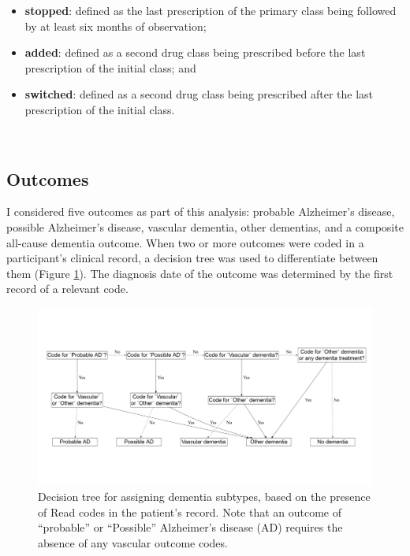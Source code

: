 \documentclass[a4paper, twoside]{templates/ociamthesis}
\providecommand{\tightlist}{%
  \setlength{\itemsep}{0pt}\setlength{\parskip}{0pt}}
\begin{document}
\begin{itemize}
\tightlist
\item
  \textbf{stopped}: defined as the last prescription of the primary class being followed by at least six months of observation;
\item
  \textbf{added}: defined as a second drug class being prescribed before the last prescription of the initial class; and
\item
  \textbf{switched}: defined as a second drug class being prescribed after the last prescription of the initial class.
\end{itemize}

~

\hypertarget{cprd-outcomes}{%
\subsection{Outcomes}\label{cprd-outcomes}}

I considered five outcomes as part of this analysis: probable Alzheimer's disease, possible Alzheimer's disease, vascular dementia, other dementias, and a composite all-cause dementia outcome. When two or more outcomes were coded in a participant's clinical record, a decision tree was used to differentiate between them (Figure \ref{fig:decisionTreeFig}). The diagnosis date of the outcome was determined by the first record of a relevant code.





\begin{figure}[H]
\includegraphics[width=1\linewidth]{figures/cprd-analysis/decision_tree} \caption[Decision tree for assigning dementia subtypes]{Decision tree for assigning dementia subtypes, based on the presence of Read codes in the patient's record. Note that an outcome of ``probable'' or ``Possible'' Alzheimer's disease (AD) requires the absence of any vascular outcome codes.}\label{fig:decisionTreeFig}
\end{figure}
\end{document}
